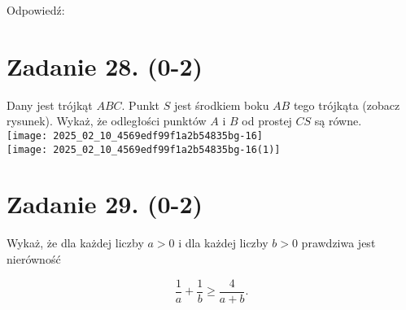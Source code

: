 \documentclass[10pt]{article}
\begin{document}
Odpowiedź:

\section*{Zadanie 28. (0-2)}
Dany jest trójkąt \(A B C\). Punkt \(S\) jest środkiem boku \(A B\) tego trójkąta (zobacz rysunek). Wykaż, że odległości punktów \(A\) i \(B\) od prostej \(C S\) są równe.\\
\texttt{[image: 2025\_02\_10\_4569edf99f1a2b54835bg-16]}\\
\texttt{[image: 2025\_02\_10\_4569edf99f1a2b54835bg-16(1)]}

\section*{Zadanie 29. (0-2)}
Wykaż, że dla każdej liczby \(a>0\) i dla każdej liczby \(b>0\) prawdziwa jest nierówność

\[
\frac{1}{a}+\frac{1}{b} \geq \frac{4}{a+b} .
\]
\end{document}
